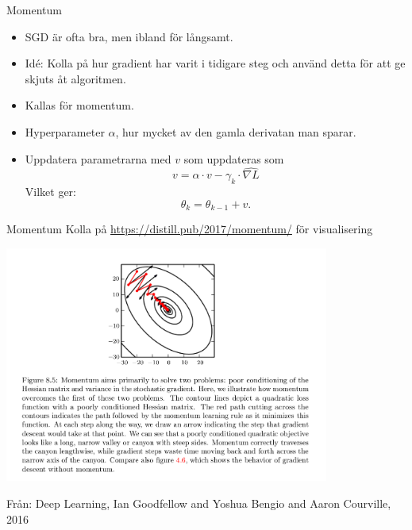 \documentclass[10pt,english]{beamer}
\begin{document}
\begin{frame}{Momentum}
    \begin{itemize}
        \item SGD är ofta bra, men ibland för långsamt.
        \item Idé: Kolla på hur gradient har varit i tidigare steg och använd detta för att ge skjuts åt algoritmen.
        \item Kallas för momentum.
        \item Hyperparameter $\alpha$, hur mycket av den gamla derivatan man sparar.
        \item Uppdatera parametrarna med $v$ som uppdateras som
        \begin{equation*}
            v = \alpha \cdot v - \gamma_k \cdot \widehat{\nabla L}
        \end{equation*}
        Vilket ger:
        \begin{equation*}
            \theta_{k} = \theta_{k-1} + v.
        \end{equation*}
    \end{itemize}
\end{frame}

\begin{frame}{Momentum}
    Kolla på \url{https://distill.pub/2017/momentum/} för visualisering

    \includegraphics[width=0.8\textwidth]{figs/Momentum.png}

    {\small{Från: Deep Learning, Ian Goodfellow and Yoshua Bengio and Aaron Courville, 2016}}
\end{frame}
\end{document}
